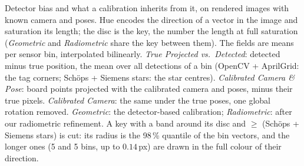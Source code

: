 Detector bias and what a calibration inherits from it, on rendered images with known camera and poses. Hue encodes the direction of a vector in the image and saturation its length; the disc is the key, the number the length at full saturation (\emph{Geometric} and \emph{Radiometric} share the key between them). The fields are means per sensor bin, interpolated bilinearly. \emph{True Projected vs.\ Detected}: detected minus true position, the mean over all detections of a bin (OpenCV + AprilGrid: the tag corners; Sch\"ops + Siemens stars: the star centres). \emph{Calibrated Camera \& Pose}: board points projected with the calibrated camera and poses, minus their true pixels. \emph{Calibrated Camera}: the same under the true poses, one global rotation removed. \emph{Geometric}: the detector-based calibration; \emph{Radiometric}: after our radiometric refinement. A key with a band around its disc and $\geq$ (Sch\"ops + Siemens stars) is cut: its radius is the 98\,\% quantile of the bin vectors, and the longer ones (5 and 5 bins, up to $0.14$\,px) are drawn in the full colour of their direction.
